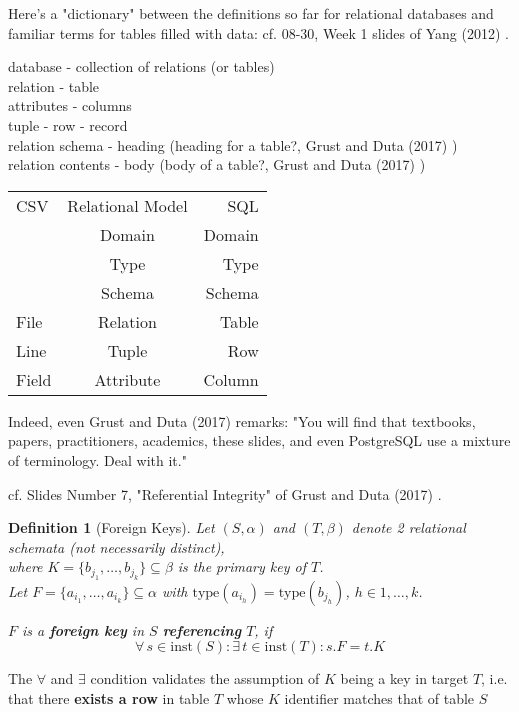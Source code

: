 \documentclass[10pt]{amsart}
\newtheorem{definition}{Definition}
\begin{document}
\begin{multicols*}{2}
Here's a "dictionary" between the definitions so far for relational databases and familiar terms for tables filled with data: cf. 08-30, Week 1 slides of Yang (2012) \cite{Yang2012}.

database - collection of relations (or tables) \\
relation - table \\
attributes - columns \\
tuple - row - record \\
relation schema - heading (heading for a table?, Grust and Duta (2017) \cite{GrDu2017}) \\
relation contents - body (body of a table?, Grust and Duta (2017) \cite{GrDu2017})

\begin{tabular}{l c r}
	CSV & Relational Model & SQL \\
	& Domain & Domain \\ 
	& Type & Type \\
	& Schema & Schema \\
	File & Relation & Table \\
	Line & Tuple & Row \\
	Field & Attribute & Column
\end{tabular}

Indeed, even Grust and Duta (2017) \cite{GrDu2017} remarks: "You will find that textbooks, papers, practitioners, academics, these slides, and even PostgreSQL use a mixture of terminology. Deal with it."


cf. Slides Number 7, "Referential Integrity" of Grust and Duta (2017) \cite{GrDu2017}.

\begin{definition}[Foreign Keys]
	Let $(S, \alpha)$ and $(T, \beta)$ denote 2 relational schemata (not necessarily distinct), \\
	where $K = \lbrace b_{j_1}, \dots , b_{j_k} \rbrace \subseteq \beta$ is the primary key of $T$. \\
	Let $F = \lbrace a_{i_1}, \dots , a_{i_k} \rbrace \subseteq \alpha $ with $\text{type}(a_{i_h}) = \text{type}(b_{j_h})$, $h \in 1, \dots, k$. 
	
	$F$ is a \textbf{foreign key} in $S$ \textbf{referencing} $T$, if 
	\[
	\forall \, s \in \text{inst}(S) : \exists \, t \in \text{inst}(T) : s.F = t.K
	\]
\end{definition} 
The $\forall$ and $\exists $ condition validates the assumption of $K$ being a key in target $T$, i.e. that there \textbf{exists a row} in table $T$ whose $K$ identifier matches that of table $S$


\end{multicols*}
\end{document}

